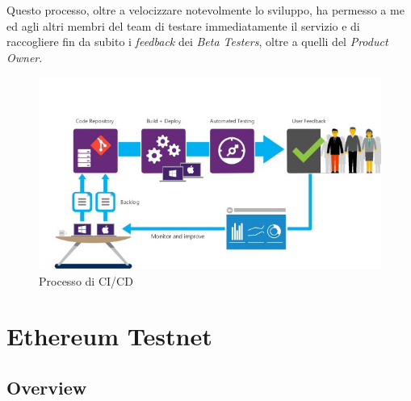 \documentclass[11pt]{thesistemp}
\begin{document}
Questo processo, oltre a velocizzare notevolmente lo sviluppo, ha permesso a me ed agli altri membri del team di testare immediatamente il servizio e di raccogliere fin da subito i \textit{feedback} dei \textit{Beta Testers}, oltre a quelli del \textit{Product Owner}.
\begin{figure}[h]
    \centering
    \includegraphics[scale=0.59]{ci-cd.png}
        \caption{Processo di CI/CD}
    \label{fig:ci-cd}
\end{figure}

\section{Ethereum Testnet}

\subsection{Overview}
\end{document}
